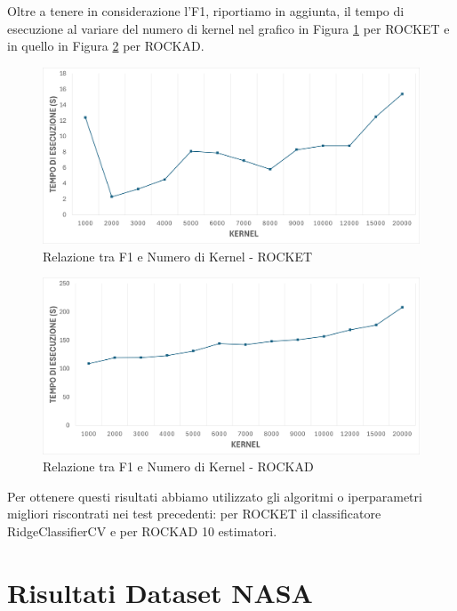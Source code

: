 Oltre a tenere in considerazione l'F1, riportiamo in aggiunta, il tempo di esecuzione al variare del numero di kernel nel grafico in Figura \ref{fig:grafico_Tempo_ROCKET_OPS_SAT} per ROCKET e in quello in Figura \ref{fig:grafico_Tempo_ROCKAD_OPS_SAT} per ROCKAD.


\begin{figure}[!ht]
    \centering
    \includegraphics[width=0.9\linewidth]{images//Capitolo7/GraficoTempoEsecuzione_ROCKET_OPS_SAT.png}
    \caption{Relazione tra F1 e Numero di Kernel - ROCKET}
    \label{fig:grafico_Tempo_ROCKET_OPS_SAT}
\end{figure}

\begin{figure}[!ht]
    \centering
    \includegraphics[width=0.9\linewidth]{images//Capitolo7/GraficoTempoEsecuzione_ROCKAD_OPS_SAT.png}
    \caption{Relazione tra F1 e Numero di Kernel - ROCKAD}
    \label{fig:grafico_Tempo_ROCKAD_OPS_SAT}
\end{figure}

Per ottenere questi risultati abbiamo utilizzato gli algoritmi o iperparametri migliori riscontrati nei test precedenti: per ROCKET il classificatore RidgeClassifierCV e per ROCKAD 10 estimatori.
\pagebreak

\section{Risultati Dataset NASA}

